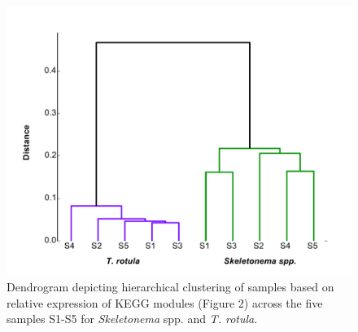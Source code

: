 \begin{figure}[p!]
  \centering
    \includegraphics[width=1\textwidth]{Images/C3_SFigure3_Dendrogram.pdf}
    \caption[Hierarchical clustering of QMF signatures across species and samples]{Dendrogram depicting hierarchical clustering of samples based on relative expression of KEGG modules (Figure 2) across the five samples S1-S5 for \textit{Skeletonema} spp. and \textit{T. rotula}.}
  \label{fig:a3f3}
\end{figure}

